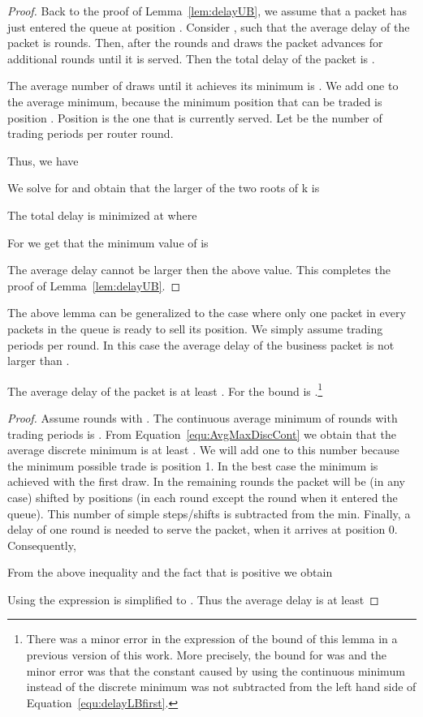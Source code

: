 \documentclass[letterpaper,10pt]{llncs}
\newcommand{\hlb}[1]{\hl{#1}}
\renewcommand{\hlb}[1]{#1}
\begin{document}
\begin{proof}
Back to the proof of Lemma~\ref{lem:delayUB}, we assume that a packet has just entered the 
queue at position .
Consider , such that the average delay of the packet is  rounds. 
Then, after the  rounds and  draws the packet advances for  additional rounds
until it is served. Then the total delay of the packet is . 

The average number of draws until it achieves its minimum is .
We add one to the average minimum, because the minimum position that can be traded 
is position . Position  is the one that is currently served.
Let  be the number of trading periods per router round. 

\noindent
Thus, we have



\noindent
We solve for  and obtain that the larger of the two roots of k is 



\noindent
The total delay 
is minimized at  where


\noindent
For  we get that the minimum value of  is 


\noindent
The average delay  cannot be larger then the above value. This completes the proof of Lemma~\ref{lem:delayUB}.
\end{proof}

The above lemma can be generalized to the case where only one packet in every  packets in the queue is ready to sell its position. We simply assume  trading periods per round. 
In this case the average delay of the business packet is not larger 
than .


\begin{lemma}
\label{lem:delayLB}
The average delay of the packet is at least .
For  the bound is .\footnote{\hlb{There was a minor error 
in the expression of the bound of this lemma in a previous version of this work. More precisely,
the bound for  was  and the minor error was that the constant  caused by 
using the continuous minimum instead of the discrete minimum was not subtracted from the left hand side 
of Equation}~\ref{equ:delayLBfirst}.}
\end{lemma}

\begin{proof}
Assume  rounds with . 
The continuous average minimum of  rounds with  trading periods is .
From Equation~\ref{equ:AvgMaxDiscCont} we obtain that the average discrete minimum is at 
least . 
We will add one to this number because the minimum possible trade is position 1.
In the best case the minimum is achieved with the first draw. In the remaining  rounds the packet will be (in any case) shifted by  positions (in each round except the round when it entered the queue).
This number of simple steps/shifts is subtracted from the min. 
Finally, a delay of one round is needed to serve the packet, when it arrives at position 0.
Consequently,




\noindent
From the above inequality and the fact that  is positive we obtain 



\noindent
Using  the expression is simplified to 
. Thus the average delay is at least


\end{proof}
\end{document}
